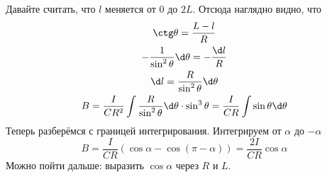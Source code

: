   Давайте считать, что $l$ меняется от $0$ до $2L$.
  Отсюда наглядно видно, что
  \begin{gather*}
    \ctg \theta = \frac{L-l}{R} \\
    - \frac 1 {\sin^2\theta} \d \theta = -\frac{\d l}{R} \\
   \d l = \frac{R}{\sin^2 \theta} \d \theta \\
    B = \frac{I}{CR^2} \int \frac{R}{\sin^2 \theta} \d \theta \cdot \sin^3 \theta
      = \frac{I}{CR} \int \sin \theta \d \theta
  \end{gather*}
  Теперь разберёмся с границей интегрирования.
  Интегрируем от $\alpha$ до $-\alpha$
  \[ B = \frac{I}{CR} (\cos \alpha - \cos(\pi-\alpha)) = \frac{2I}{CR} \cos \alpha\]
  Можно пойти дальше: выразить $\cos \alpha$ через $R$ и $L$.
